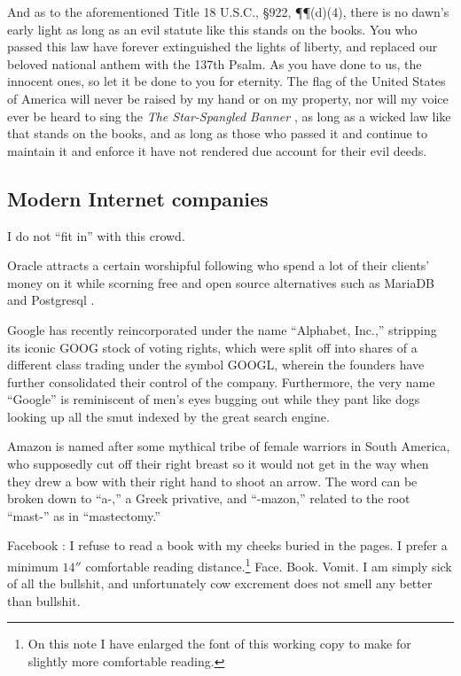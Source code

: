\documentclass[letterpaper]{article}
\begin{document}
And as to the aforementioned Title 18 U.S.C., \S922, \P\P(d)(4), there is no dawn's early light as long as an evil statute like this stands on the books.  You who passed this law have forever extinguished the lights of liberty, and replaced our beloved national anthem with the 137th Psalm.  As you have done to us, the innocent ones, so let it be done to you for eternity.  The flag of the United States of America will never be raised by my hand or on my property, nor will my voice ever be heard to sing the \textit{The Star-Spangled Banner} \cite{key1814star}, as long as a wicked law like that stands on the books, and as long as those who passed it and continue to maintain it and enforce it have not rendered due account for their evil deeds.
\subsection{Modern Internet companies}
I do not ``fit in'' with this crowd. 

Oracle \cite{orcl2016} attracts a certain worshipful following who spend a lot of their clients' money on it while scorning free and open source alternatives such as MariaDB \cite{mariadb2016} and Postgresql \cite{postgresql2016}.

Google \cite{page2016alphabet} has recently reincorporated under the name ``Alphabet, Inc.,'' stripping its iconic GOOG stock of voting rights, which were split off into shares of a different class trading under the symbol GOOGL, wherein the founders have further consolidated their control of the company.  Furthermore, the very name ``Google'' is reminiscent of men's eyes bugging out while they pant like dogs looking up all the smut indexed by the great search engine.

Amazon \cite{amazon2016} is named after some mythical tribe of female warriors in South America, who supposedly cut off their right breast so it would not get in the way when they drew a bow with their right hand to shoot an arrow.  The word can be broken down to ``a-,'' a Greek privative, and ``-mazon,'' related to the root ``mast-'' as in ``mastectomy.''

Facebook \cite{facebook2016}:  I refuse to read a book with my cheeks buried in the pages.  I prefer a minimum $14''$ comfortable reading distance.\footnote{On this note I have enlarged the font of this working copy to make for slightly more comfortable reading.} Face. Book. Vomit.  I am simply sick of all the bullshit, and unfortunately cow excrement does not smell any better than bullshit.

 {}
\end{document}
